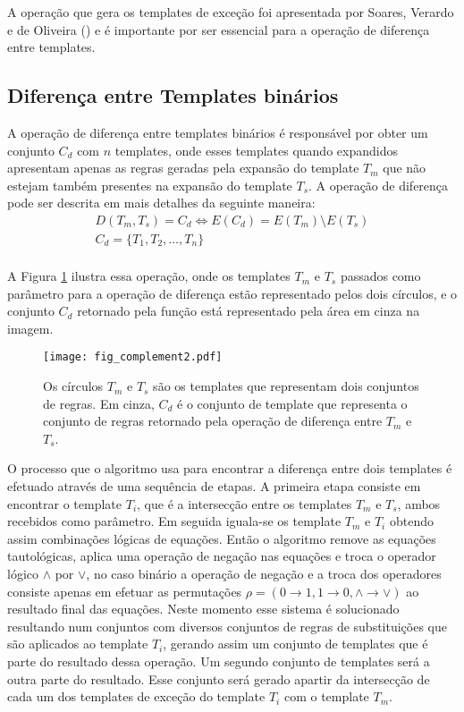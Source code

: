 A operação que gera os templates de exceção foi apresentada por Soares, Verardo e
de Oliveira (\citeyear{soares2016difference}) e é importante por ser essencial para a operação de diferença entre templates.

\subsection{Diferença entre Templates binários}
A operação de diferença entre templates binários é responsável por obter um conjunto $C_d$ com $n$ templates, onde esses templates quando expandidos apresentam apenas as regras geradas pela expansão do template $T_m$ que não estejam também presentes na expansão do template $T_s$. A operação de diferença pode ser descrita em mais detalhes da seguinte maneira:
\begin{equation}
\begin{split}
D(T_m,T_s)= C_d \Leftrightarrow E(C_d) = E(T_m) \setminus E(T_s) \\
C_d = \{T_1,T_2,\dots, T_n\}\\
\end{split}
\end{equation}

A Figura \ref{fig:complement} ilustra essa operação, onde os templates $T_m$ e $T_s$ passados como parâmetro para a operação de diferença estão representado pelos dois círculos, e o conjunto $C_d$ retornado pela função está representado pela área em cinza na imagem.
\begin{figure}[h!]
  \centering
  \texttt{[image: fig\_complement2.pdf]}
  \caption{Os círculos $T_m$ e $T_s$ são os templates que representam dois conjuntos de regras. Em cinza, $C_d$ é o conjunto de template que representa o conjunto de regras retornado pela operação de diferença entre $T_m$ e $T_s$.}
  \label{fig:complement}
\end{figure}    

O processo que o algoritmo usa para encontrar a diferença entre dois templates é efetuado através de uma sequência de etapas. A primeira etapa consiste em encontrar o template $T_i$, que é a intersecção entre os templates $T_m$ e $T_s$, ambos recebidos como parâmetro. Em seguida iguala-se os template $T_m$ e $T_i$ obtendo assim combinações lógicas de equações. Então o algoritmo remove as equações tautológicas, aplica uma operação de negação nas equações e troca o operador lógico $\wedge$ por $\vee$, no caso binário a operação de negação e a troca dos operadores consiste apenas em efetuar as permutações $\rho = (0 \rightarrow 1, 1 \rightarrow 0, \wedge \rightarrow \vee)$ ao resultado final das equações. Neste momento esse sistema é solucionado resultando num conjuntos com diversos conjuntos de regras de substituições que são aplicados ao template $T_i$, gerando assim um conjunto de templates que é parte do resultado dessa operação. Um segundo conjunto de templates será a outra parte do resultado. Esse conjunto será gerado apartir da intersecção de cada um dos templates de exceção do template $T_i$ com o template $T_m$. 

